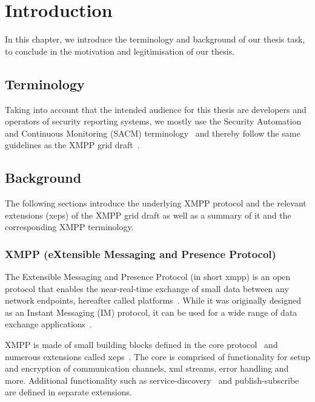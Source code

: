 \newcommand{\code}{\texttt}
\chapter{Introduction}
\label{sec:introduction}

In this chapter, we introduce the terminology and background of our thesis task, to conclude in the motivation and legitimisation of our thesis.

\section{Terminology}
Taking into account that the intended audience for this thesis are developers and operators of security reporting systems, 
we mostly use the  Security Automation and Continuous Monitoring (SACM) terminology~\cite{ietf-sacm-terminology-14}
and thereby follow the same guidelines as the XMPP grid draft~\cite{ietf-mile-xmpp-grid-05}.

\section{Background}

The following sections introduce the underlying XMPP protocol and the relevant extensions (\glspl{xep}) of the XMPP grid draft as well as a summary of it and the corresponding XMPP terminology.

\subsection{XMPP (eXtensible Messaging and Presence Protocol)}
The Extensible Messaging and Presence Protocol (in short \gls{xmpp}) is an open protocol that enables the near-real-time exchange of small data between any network endpoints, hereafter called \glspl{platform}~\cite{rfc6120}.
While it was originally designed as an Instant Messaging (IM) protocol, it can be used for a wide range of data exchange applications~\cite{ieee-xplore-stream-xml-xmpp}.

XMPP is made of small building blocks defined in the core protocol~\cite{rfc6120} and numerous extensions called \glspl{xep}~\cite{xep-0001}.
The core is comprised of functionality for setup and encryption of communication channels, \gls{xml} streams, error handling and more. Additional functionality such as \gls{service-discovery}~\cite{xep-0030} and \gls{publish-subscribe}~\cite{xep-0060} are defined in separate extensions.

